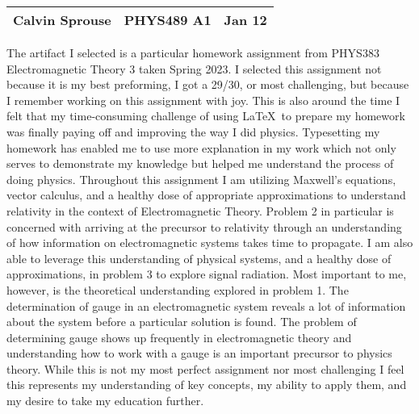 \documentclass[a4paper, 12pt]{config/homework}
\begin{document}
\noindent
\begin{tabularx}{\textwidth}{>{\centering\arraybackslash}X>{\centering\arraybackslash}X>{\centering\arraybackslash}X}
Calvin Sprouse & PHYS489 A1 & 2024 Jan 12\\
\midrule
\end{tabularx}


The artifact I selected is a particular homework assignment from PHYS383 Electromagnetic Theory 3 taken Spring 2023. I selected this assignment not because it is my best preforming, I got a 29/30, or most challenging, but because I remember working on this assignment with joy. This is also around the time I felt that my time-consuming challenge of using \LaTeX\ to prepare my homework was finally paying off and improving the way I did physics. Typesetting my homework has enabled me to use more explanation in my work which not only serves to demonstrate my knowledge but helped me understand the process of doing physics. Throughout this assignment I am utilizing Maxwell's equations, vector calculus, and a healthy dose of appropriate approximations to understand relativity in the context of Electromagnetic Theory. Problem 2 in particular is concerned with arriving at the precursor to relativity through an understanding of how information on electromagnetic systems takes time to propagate. I am also able to leverage this understanding of physical systems, and a healthy dose of approximations, in problem 3 to explore signal radiation. Most important to me, however, is the theoretical understanding explored in problem 1. The determination of gauge in an electromagnetic system reveals a lot of information about the system before a particular solution is found. The problem of determining gauge shows up frequently in electromagnetic theory and understanding how to work with a gauge is an important precursor to physics theory. While this is not my most perfect assignment nor most challenging I feel this represents my understanding of key concepts, my ability to apply them, and my desire to take my education further.


\end{document}

